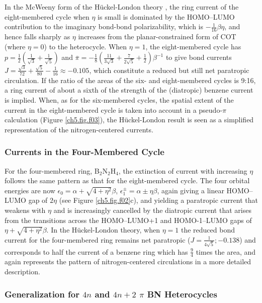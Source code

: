 In the McWeeny form of the H\"uckel-London theory \cite{r23}, the ring current of the eight-membered cycle when $\eta$ is small is
dominated by the HOMO--LUMO contribution to the imaginary bond-bond polarizability, which is $-\frac{1}{16} \beta \eta$, and hence falls
sharply as $\eta$ increases from the planar-constrained form of COT (where $\eta=0$) to the heterocycle. When $\eta=1$, the
eight-membered cycle has $p=\frac{1}{2}(\frac{1}{\sqrt{3}}+\frac{1}{\sqrt{5}})$ and
$\overline{\pi}=-\frac{1}{8}(\frac{11}{3\sqrt{3}}+\frac{7}{2\sqrt{5}}+\frac{1}{2})\beta^{-1}$ to give bond currents
$J=\frac{\sqrt{3}}{72}+\frac{\sqrt{5}}{80}-\frac{1}{16}\approx -0.105$, which constitute a reduced but still net paratropic circulation.
If the ratio of the areas of the six- and eight-membered cycles is 9:16, a ring current of about a sixth of the strength of the
(diatropic) benzene current is implied. When, as for the six-membered cycles, the spatial extent of the current in the eight-membered
cycle is taken into account in a pseudo-$\pi$ calculation (Figure \ref{ch5.fig.f03}), the H\"uckel-London result is seen as a simplified
representation of the nitrogen-centered currents.

\subsubsection{Currents in the Four-Membered Cycle}

For the four-membered ring, B$_2$N$_2$H$_4$, the extinction of current with increasing $\eta$ follows the same pattern as that for the
eight-membered cycle. The four orbital energies are now $\epsilon_{0} = \alpha + \sqrt{4+\eta^{2}}\beta$,
$\epsilon_{1}^{\pm} = \alpha \pm \eta \beta$, again giving a linear HOMO--LUMO gap of $2\eta$ (see Figure \ref{ch5.fig.f02}c), and yielding
a paratropic current that weakens with $\eta$ and is increasingly cancelled by the diatropic current that arises from the transitions
across the HOMO--LUMO+1 and \mbox{HOMO-1}--LUMO gaps of $\eta+\sqrt{4+\eta^{2}}\beta$. In the H\"uckel-London theory, when $\eta=1$ the reduced
bond current for the four-membered ring remains net paratropic ($J=\frac{1}{4\sqrt{5}}; -0.138$) and corresponds to half the current
of a benzene ring which has $\frac{9}{4}$ times the area, and again represents the pattern of nitrogen-centered circulations in a more
detailed description.

\subsubsection{Generalization for $4n$ and $4n+2$ $\pi$ BN Heterocycles}

